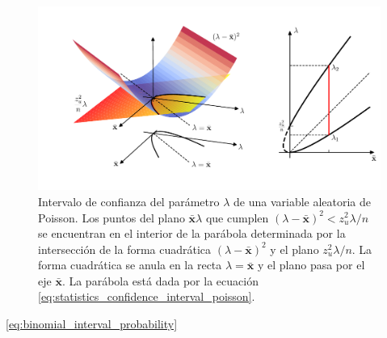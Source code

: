 \documentclass[a4paper]{report}
\newcommand{\x}{\mathbf{x}}
\begin{document}
\begin{figure}[!htb]
\begin{center}
\includegraphics[width=1\columnwidth]{figuras/poisson_confidence_interval_v3.pdf}
\caption{\label{fig:poisson_confidence_interval_v3} Intervalo de confianza del parámetro \(\lambda\) de una variable aleatoria de Poisson. Los puntos del plano \(\bar{\x}\lambda\) que cumplen \((\lambda-\bar{\x})^2<z_u^2\lambda/n\) se encuentran en el interior de la parábola determinada por la intersección de la forma cuadrática \((\lambda-\bar{\x})^2\) y el plano \(z_u^2\lambda/n\). La forma cuadrática se anula en la recta \(\lambda=\bar{\x}\) y el plano pasa por el eje \(\bar{\x}\). La parábola está dada por la ecuación \ref{eq:statistics_confidence_interval_poisson}.}
\end{center}
\end{figure}

\ref{eq:binomial_interval_probability}




\end{document}
